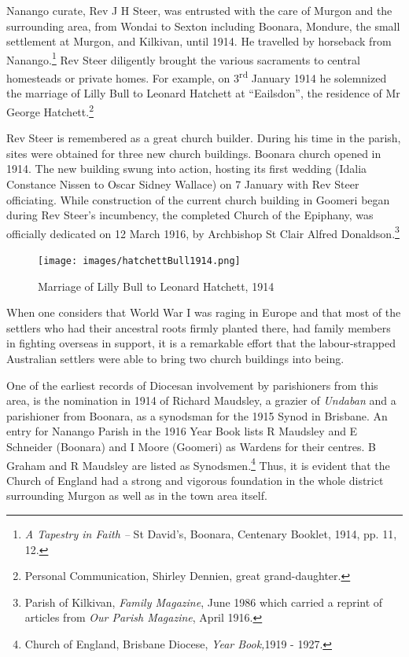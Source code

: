 Nanango curate, Rev J H Steer, was entrusted with the care of Murgon and
the surrounding area, from Wondai to Sexton including Boonara, Mondure,
the small settlement at Murgon, and Kilkivan, until 1914. He travelled
by horseback from Nanango.\footnote{\emph{A Tapestry in Faith --} St
  David's, Boonara, Centenary Booklet, 1914, pp. 11, 12.} Rev Steer
diligently brought the various sacraments to central homesteads or
private homes. For example, on 3\textsuperscript{rd} January 1914 he
solemnized the marriage of Lilly Bull to Leonard Hatchett at
``Eailsdon'', the residence of Mr George Hatchett.\footnote{Personal
  Communication, Shirley Dennien, great grand-daughter.}

Rev Steer is remembered as a great church builder. During his time in
the parish, sites were obtained for three new church buildings. Boonara
church opened in 1914. The new building swung into action, hosting its
first wedding (Idalia Constance Nissen to Oscar Sidney Wallace) on 7
January with Rev Steer officiating. While construction of the current
church building in Goomeri began during Rev Steer's incumbency, the
completed Church of the Epiphany, was officially dedicated on 12 March
1916, by Archbishop St Clair Alfred Donaldson.\footnote{Parish of
  Kilkivan, \emph{Family Magazine}, June 1986 which carried a reprint of
  articles from \emph{Our Parish Magazine}, April 1916.}




\begin{figure}[!h]
\begin{center}
\texttt{[image: images/hatchettBull1914.png]}
\caption{Marriage of Lilly Bull to Leonard Hatchett, 1914}
\end{center}
\end{figure}


When one considers that World War I was raging in Europe and that most
of the settlers who had their ancestral roots firmly planted there, had
family members in fighting overseas in support, it is a remarkable
effort that the labour-strapped Australian settlers were able to bring
two church buildings into being.

One of the earliest records of Diocesan involvement by parishioners from
this area, is the nomination in 1914 of Richard Maudsley, a grazier of
\emph{Undaban} and a parishioner from Boonara, as a synodsman for the
1915 Synod in Brisbane. An entry for Nanango Parish in the 1916 Year
Book lists R Maudsley and E Schneider (Boonara) and I Moore (Goomeri) as
Wardens for their centres. B Graham and R Maudsley are listed as
Synodsmen.\footnote{Church of England, Brisbane Diocese, \emph{Year
  Book,}1919 - 1927.} Thus, it is evident that the Church of England had
a strong and vigorous foundation in the whole district surrounding
Murgon as well as in the town area itself.




